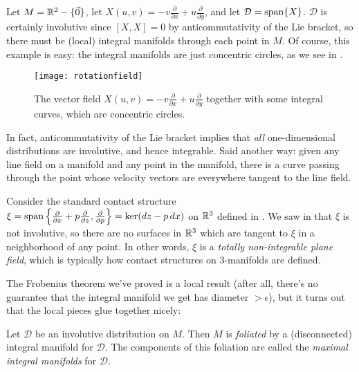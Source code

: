 \begin{example}\label{ex:rotation field distribution}
	Let $M = \mathbb{R}^2 - \{\vec{0}\}$, let $X(u,v) = -v \frac{\partial}{\partial x} + u \frac{\partial}{\partial y}$, and let $\mathcal{D} = \operatorname{span} \{X\}$. $\mathcal{D}$ is certainly involutive since $[X,X]=0$ by anticommutativity of the Lie bracket, so there must be (local) integral manifolds through each point in $M$. Of course, this example is easy: the integral manifolds are just concentric circles, as we see in .
	
	\begin{figure}[htbp]
		\centering
			\texttt{[image: rotationfield]}
		\caption{The vector field $X(u,v) = -v \frac{\partial}{\partial x} + u \frac{\partial}{\partial y}$ together with some integral curves, which are concentric circles.}
		\label{fig:concentric circles}
	\end{figure}
\end{example}

In fact, anticommutativity of the Lie bracket implies that \emph{all} one-dimensional distributions are involutive, and hence integrable. Said another way: given any line field on a manifold and any point in the manifold, there is a curve passing through the point whose velocity vectors are everywhere tangent to the line field.

\begin{example}
	Consider the standard contact structure $\xi = \operatorname{span} \left\{ \frac{\partial}{\partial x} + p \frac{\partial}{\partial z}, \frac{\partial}{\partial p} \right\} = \ker(dz - p\, dx)$ on $\mathbb{R}^3$ defined in . We saw in  that $\xi$ is not involutive, so there are no surfaces in $\mathbb{R}^3$ which are tangent to $\xi$ in a neighborhood of any point. In other words, $\xi$ is a \emph{totally non-integrable plane field}, which is typically how contact structures on 3-manifolds are defined.
\end{example}

The Frobenius theorem we've proved is a local result (after all, there's no guarantee that the integral manifold we get has diameter $> \epsilon$), but it turns out that the local pieces glue together nicely:

\begin{theorem}\label{thm:global Frobenius}
	Let $\mathcal{D}$ be an involutive distribution on $M$. Then $M$ is \emph{foliated} by a (disconnected) integral manifold for $\mathcal{D}$. The components of this foliation are called the \emph{maximal integral manifolds} for $\mathcal{D}$.
\end{theorem}

